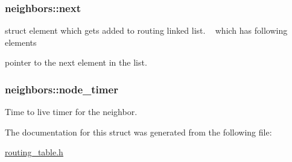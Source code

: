 \subsubsection[{\texorpdfstring{next}{next}}]{\setlength{\rightskip}{0pt plus 5cm}neighbors\+::next}\hypertarget{structneighbors_ac2168f200163eaa32fb01444a94ab16d}{}\label{structneighbors_ac2168f200163eaa32fb01444a94ab16d}
struct element which gets added to routing linked list. ~\newline
 which has following elements ~\newline


pointer to the next element in the list. ~\newline
\subsubsection[{\texorpdfstring{node\+\_\+timer}{node_timer}}]{\setlength{\rightskip}{0pt plus 5cm}neighbors\+::node\+\_\+timer}\hypertarget{structneighbors_afe56765f4d5b05b9b6072923540a459e}{}\label{structneighbors_afe56765f4d5b05b9b6072923540a459e}
Time to live timer for the neighbor. 

The documentation for this struct was generated from the following file\+:\begin{DoxyCompactItemize}
\item 
\hyperlink{routing__table_8h}{routing\+\_\+table.\+h}\end{DoxyCompactItemize}
